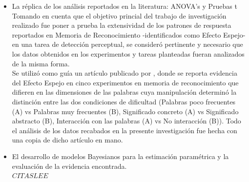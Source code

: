 \begin{itemize}
\item La réplica de los análisis reportados en la literatura: ANOVA's y Pruebas t\\

Tomando en cuenta que el objetivo princial del trabajo de investigación realizado fue poner a prueba la extensividad de los patrones de respuesta reportados en Memoria de Reconocimiento -identificados como Efecto Espejo- en una tarea de detección perceptual, se consideró pertinente y necesario que los datos obtenidos en los experimentos y tareas planteadas fueran analizados de la misma forma.\\

Se utilizó como guía un artículo publicado por \parencite{Glanzer1990}, donde se reporta evidencia del Efecto Espejo en cinco experimentos en memoria de reconocimiento que difieren en las dimensiones de las palabras cuya manipulación determinó la distinción entre las dos condiciones de dificultad (Palabras poco frecuentes (A) vs Palabras muy frecuentes (B), Significado concreto (A) vs Significado abstracto (B), Interacción con las palabras (A) vs No interacción (B)). Todo el análisis de los datos recabados en la presente investigación fue hecha con una copia de dicho artículo en mano.\\ 

\item El desarrollo de modelos Bayesianos para la estimación paramétrica y la evaluación de la evidencia encontrada.\\



$CITAS LEE$



\end{itemize}
